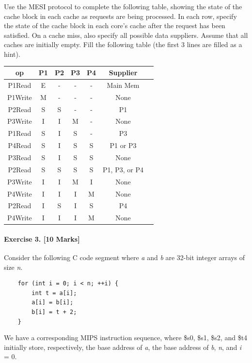 \documentclass[12pt, a4paper]{article}
\begin{document}
Use the MESI protocol to complete the following table, showing the state of the cache block in each cache as requests are being processed. In each row, specify the state of the cache block in each core's cache after the request has been satisfied. On a cache miss, also specify all possible data suppliers. Assume that all caches are initially empty. Fill the following table (the first 3 lines are filled as a hint).

\begin{center}
\begin{tabular}{|c|c|c|c|c|c|c|}
\hline
\textbf{op} & \textbf{P1} & \textbf{P2} & \textbf{P3} & \textbf{P4} & \textbf{Supplier} \\
\hline
P1Read & E & - & - & - & Main Mem \\
\hline
P1Write & M & - & - & - & None \\
\hline
P2Read & S & S & - & - & P1 \\
\hline
P3Write & I & I & M & - & None \\
\hline
P1Read & S & I & S & - & P3 \\
\hline
P4Read & S & I & S & S & P1 or P3 \\
\hline
P3Read & S & I & S & S & None \\
\hline
P2Read & S & S & S & S & P1, P3, or P4 \\
\hline
P3Write & I & I & M & I & None\\
\hline
P4Write & I & I & I & M & None \\
\hline
P2Read & I & S & I & S & P4 \\
\hline
P4Write & I & I & I & M & None \\
\hline
\end{tabular}
\end{center}

\newpage

\paragraph{Exercise 3. [10 Marks]} Consider the following C code segment where \textit{a} and \textit{b} are 32-bit integer arrays of size \textit{n}.
\begin{verbatim}
    for (int i = 0; i < n; ++i) {
        int t = a[i];
        a[i] = b[i];
        b[i] = t + 2;
    }
\end{verbatim}

We have a corresponding MIPS instruction sequence, where \$s0, \$s1, \$s2, and \$t4 initially store, respectively, the base address of \textit{a}, the base address of \textit{b}, \textit{n}, and \textit{i} = 0.
\end{document}
